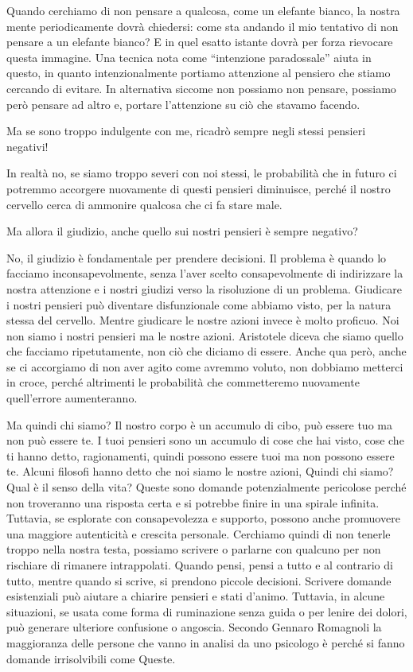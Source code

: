 \documentclass[12pt]{book} %
\begin{document}
Quando cerchiamo di non pensare a qualcosa, come un elefante bianco, la nostra mente periodicamente dovrà chiedersi:
come sta andando il mio tentativo di non pensare a un elefante bianco? E in quel esatto istante dovrà per forza
rievocare questa immagine. Una tecnica nota come “intenzione paradossale” aiuta in questo, in quanto intenzionalmente
portiamo attenzione al pensiero che stiamo cercando di evitare. In alternativa siccome non possiamo non pensare,
possiamo però pensare ad altro e, portare l'attenzione su ciò che stavamo facendo. 

Ma se sono troppo indulgente con me, ricadrò sempre negli stessi pensieri negativi! 

In realtà no, se siamo troppo severi con noi stessi, le probabilità che in futuro ci potremmo accorgere nuovamente di
questi pensieri diminuisce, perché il nostro cervello cerca di ammonire qualcosa che ci fa stare male. 

Ma allora il giudizio, anche quello sui nostri pensieri è sempre negativo?

No, il giudizio è fondamentale per prendere decisioni. Il problema è quando lo facciamo inconsapevolmente, senza
l'aver scelto consapevolmente di indirizzare la nostra attenzione e i nostri giudizi verso la
risoluzione di un problema. Giudicare i nostri pensieri può diventare disfunzionale come abbiamo visto, per la natura stessa del
cervello. Mentre giudicare le nostre azioni invece è molto proficuo. Noi non siamo i nostri pensieri ma le nostre
azioni. Aristotele diceva che siamo quello che facciamo ripetutamente, non ciò che diciamo di essere. Anche qua però, anche se ci accorgiamo di non aver agito come avremmo voluto, non dobbiamo metterci in croce, perché altrimenti le probabilità che commetteremo nuovamente quell'errore aumenteranno. 

Ma quindi chi siamo? Il nostro corpo è un accumulo di cibo, può essere tuo ma non può essere te. I tuoi pensieri sono un
accumulo di cose che hai visto, cose che ti hanno detto, ragionamenti, quindi possono essere tuoi ma non possono essere
te. Alcuni filosofi hanno detto che noi siamo le nostre azioni, Quindi chi siamo? Qual è il senso della vita? Queste sono domande
potenzialmente pericolose perché non troveranno una risposta certa e si potrebbe finire in una spirale infinita. Tuttavia, se esplorate con consapevolezza e supporto, possono anche promuovere una maggiore autenticità e crescita personale. Cerchiamo quindi di non tenerle troppo nella nostra testa, possiamo scrivere o parlarne con qualcuno per non rischiare di rimanere intrappolati. Quando pensi, pensi a tutto e al contrario di tutto, mentre quando si scrive, si prendono piccole decisioni. Scrivere domande esistenziali può aiutare a chiarire pensieri e stati d’animo. Tuttavia, in alcune situazioni, se usata come forma di ruminazione senza guida o per lenire dei dolori, può generare ulteriore confusione o angoscia. 
Secondo Gennaro Romagnoli la maggioranza delle persone che vanno in analisi da uno psicologo è perché si fanno domande irrisolvibili come Queste.
\end{document}
